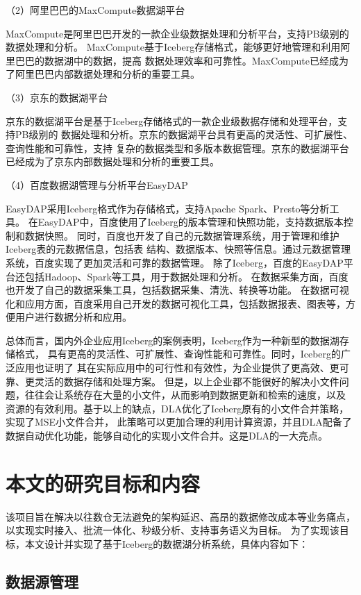 （2）阿里巴巴的MaxCompute数据湖平台

MaxCompute是阿里巴巴开发的一款企业级数据处理和分析平台，支持PB级别的数据处理和分析\cite{39}。
MaxCompute基于Iceberg存储格式，能够更好地管理和利用阿里巴巴的数据湖中的数据，提高
数据处理效率和可靠性。MaxCompute已经成为了阿里巴巴内部数据处理和分析的重要工具。

（3）京东的数据湖平台

京东的数据湖平台是基于Iceberg存储格式的一款企业级数据存储和处理平台，支持PB级别的
数据处理和分析。京东的数据湖平台具有更高的灵活性、可扩展性、查询性能和可靠性，支持
复杂的数据类型和多版本数据管理。京东的数据湖平台已经成为了京东内部数据处理和分析的重要工具。

（4）百度数据湖管理与分析平台EasyDAP

EasyDAP采用Iceberg格式作为存储格式，支持Apache Spark、Presto等分析工具。
在EasyDAP中，百度使用了Iceberg的版本管理和快照功能，支持数据版本控制和数据快照。
同时，百度也开发了自己的元数据管理系统，用于管理和维护Iceberg表的元数据信息，包括表
结构、数据版本、快照等信息。通过元数据管理系统，百度实现了更加灵活和可靠的数据管理。
除了Iceberg，百度的EasyDAP平台还包括Hadoop、Spark等工具，用于数据处理和分析。
在数据采集方面，百度也开发了自己的数据采集工具，包括数据采集、清洗、转换等功能。
在数据可视化和应用方面，百度采用自己开发的数据可视化工具，包括数据报表、图表等，方便用户进行数据分析和应用。

总体而言，国内外企业应用Iceberg的案例表明，Iceberg作为一种新型的数据湖存储格式，
具有更高的灵活性、可扩展性、查询性能和可靠性。同时，Iceberg的广泛应用也证明了
其在实际应用中的可行性和有效性，为企业提供了更高效、更可靠、更灵活的数据存储和处理方案。
但是，以上企业都不能很好的解决小文件问题，往往会让系统存在大量的小文件，从而影响到数据更新和检索的速度，以及
资源的有效利用。基于以上的缺点，DLA优化了Iceberg原有的小文件合并策略，实现了MSE小文件合并，
此策略可以更加合理的利用计算资源，并且DLA配备了数据自动优化功能，能够自动化的实现小文件合并。这是DLA的一大亮点。

\section{本文的研究目标和内容}

该项目旨在解决以往数仓无法避免的架构延迟、高昂的数据修改成本等业务痛点，以实现实时接入、批流一体化、秒级分析、支持事务语义为目标。
为了实现该目标，本文设计并实现了基于Iceberg的数据湖分析系统，具体内容如下：

\subsection{数据源管理}

